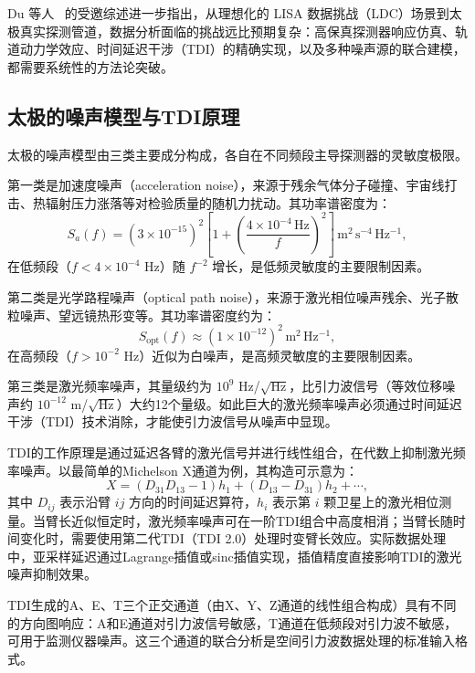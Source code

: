 Du 等人~\cite{du2026taiji} 的受邀综述进一步指出，从理想化的 LISA 数据挑战（LDC）场景到太极真实探测管道，数据分析面临的挑战远比预期复杂：高保真探测器响应仿真、轨道动力学效应、时间延迟干涉（TDI）的精确实现，以及多种噪声源的联合建模，都需要系统性的方法论突破。

\subsection{太极的噪声模型与TDI原理}

太极的噪声模型由三类主要成分构成，各自在不同频段主导探测器的灵敏度极限。

第一类是加速度噪声（acceleration noise），来源于残余气体分子碰撞、宇宙线打击、热辐射压力涨落等对检验质量的随机力扰动。其功率谱密度为：
\begin{equation}
S_a(f) = \left(3\times10^{-15}\right)^2 \left[1 + \left(\frac{4\times10^{-4}\,\mathrm{Hz}}{f}\right)^2\right] \,\mathrm{m^2\,s^{-4}\,Hz^{-1}},
\end{equation}
在低频段（$f < 4\times10^{-4}$ Hz）随 $f^{-2}$ 增长，是低频灵敏度的主要限制因素。

第二类是光学路程噪声（optical path noise），来源于激光相位噪声残余、光子散粒噪声、望远镜热形变等。其功率谱密度约为：
\begin{equation}
S_\mathrm{opt}(f) \approx \left(1\times10^{-12}\right)^2 \,\mathrm{m^2\,Hz^{-1}},
\end{equation}
在高频段（$f > 10^{-2}$ Hz）近似为白噪声，是高频灵敏度的主要限制因素。

第三类是激光频率噪声，其量级约为 $10^9$ Hz/$\sqrt{\mathrm{Hz}}$，比引力波信号（等效位移噪声约 $10^{-12}$ m/$\sqrt{\mathrm{Hz}}$）大约12个量级。如此巨大的激光频率噪声必须通过时间延迟干涉（TDI）技术消除，才能使引力波信号从噪声中显现。

TDI的工作原理是通过延迟各臂的激光信号并进行线性组合，在代数上抑制激光频率噪声。以最简单的Michelson X通道为例，其构造可示意为：
\begin{equation}
X = (D_{31}D_{13} - 1)h_1 + (D_{13} - D_{31})h_2 + \cdots,
\end{equation}
其中 $D_{ij}$ 表示沿臂 $ij$ 方向的时间延迟算符，$h_i$ 表示第 $i$ 颗卫星上的激光相位测量。当臂长近似恒定时，激光频率噪声可在一阶TDI组合中高度相消；当臂长随时间变化时，需要使用第二代TDI（TDI 2.0）处理时变臂长效应。实际数据处理中，亚采样延迟通过Lagrange插值或sinc插值实现，插值精度直接影响TDI的激光噪声抑制效果。

TDI生成的A、E、T三个正交通道（由X、Y、Z通道的线性组合构成）具有不同的方向图响应：A和E通道对引力波信号敏感，T通道在低频段对引力波不敏感，可用于监测仪器噪声。这三个通道的联合分析是空间引力波数据处理的标准输入格式。

